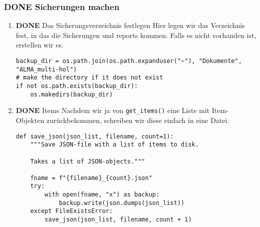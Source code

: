 \documentclass[10pt, a4paper]{scrartcl}
\begin{document}
\subsubsection{{\bfseries\sffamily DONE} Sicherungen machen}
\label{sec:org8d236e8}
\begin{enumerate}
\item {\bfseries\sffamily DONE} Das Sicherungsverzeichnis festlegen
\label{sec:org63b3563}
Hier legen wir das Verzeichnis fest, in das die Sicherungen und reports
kommen. Falls es nicht vorhanden ist, erstellen wir es.

\begin{verbatim}
backup_dir = os.path.join(os.path.expanduser("~"), "Dokumente", "ALMA_multi-hol")
# make the directory if it does not exist
if not os.path.exists(backup_dir):
    os.makedirs(backup_dir)
\end{verbatim}

\item {\bfseries\sffamily DONE} Items
\label{sec:org7c1219d}
Nachdem wir ja von \texttt{get\_items()} eine Liste mit Item-Objekten
zurückbekommen, schreiben wir diese einfach in eine Datei.

\begin{verbatim}
def save_json(json_list, filename, count=1):
    """Save JSON-file with a list of items to disk.

    Takes a list of JSON-objects."""

    fname = f"{filename}_{count}.json"
    try:
        with open(fname, "x") as backup:
            backup.write(json.dumps(json_list))
    except FileExistsError:
        save_json(json_list, filename, count + 1)
\end{verbatim}
\end{enumerate}
\end{document}
